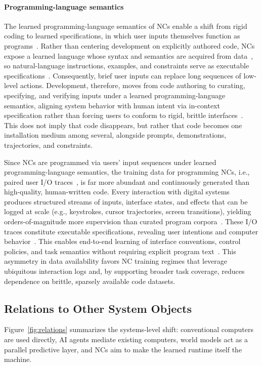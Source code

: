 \paragraph{Programming-language semantics}
The learned programming-language semantics of NCs enable a shift from rigid coding to learned specifications, in which user inputs themselves function as programs~\citep{brown2020language,wei2022chain}. 
Rather than centering development on explicitly authored code, NCs expose a learned language whose syntax and semantics are acquired from data~\citep{radford2019language,bommasani2021opportunities}, so natural-language instructions, examples, and constraints serve as executable specifications~\citep{ouyang2022training}. 
Consequently, brief user inputs can replace long sequences of low-level actions. 
Development, therefore, moves from code authoring to curating, specifying, and verifying inputs under a learned programming-language semantics, aligning system behavior with human intent via in-context specification rather than forcing users to conform to rigid, brittle interfaces~\citep{austin2021program}.
This does not imply that code disappears, but rather that code becomes one installation medium among several, alongside prompts, demonstrations, trajectories, and constraints.

Since NCs are programmed via users' input sequences under learned programming-language semantics, the training data for programming NCs, i.e., paired user I/O traces~\citep{flener2008introduction}, is far more abundant and continuously generated than high-quality, human-written code.
Every interaction with digital systems produces structured streams of inputs, interface states, and effects that can be logged at scale (e.g., keystrokes, cursor trajectories, screen transitions), yielding orders-of-magnitude more supervision than curated program corpora~\citep{yao2022webshop}. 
These I/O traces constitute executable specifications, revealing user intentions and computer behavior~\citep{cypher1993watch}.
This enables end-to-end learning of interface conventions, control policies, and task semantics without requiring explicit program text~\citep{yao2022react}. This asymmetry in data availability favors NC training regimes that leverage ubiquitous interaction logs and, by supporting broader task coverage, reduces dependence on brittle, sparsely available code datasets.

\subsection{Relations to Other System Objects}
\label{sec:relations}
Figure~\ref{fig:relations} summarizes the systems-level shift: conventional computers are used directly, AI agents mediate existing computers, world models act as a parallel predictive layer, and NCs aim to make the learned runtime itself the machine.


